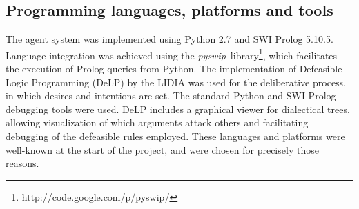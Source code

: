 



% 
%

\subsection{Programming languages, platforms and tools}
    The agent system was implemented using Python 2.7 and SWI Prolog
    5.10.5.  Language integration was achieved using the \textit{pyswip}\
    library\footnote{http://code.google.com/p/pyswip/}, which facilitates the
    execution of Prolog queries from Python.  The implementation of Defeasible
    Logic Programming (DeLP) by the LIDIA \cite{Garcia:2004a} was used for the
    deliberative process, in which desires and intentions are set.  The
    standard Python and SWI-Prolog debugging tools were used.  DeLP includes
    a graphical viewer for dialectical trees, allowing visualization of which
    arguments attack others and facilitating debugging of the defeasible rules
    employed.  These languages and platforms were well-known at the start of
    the project, and were chosen for precisely those reasons.
    

